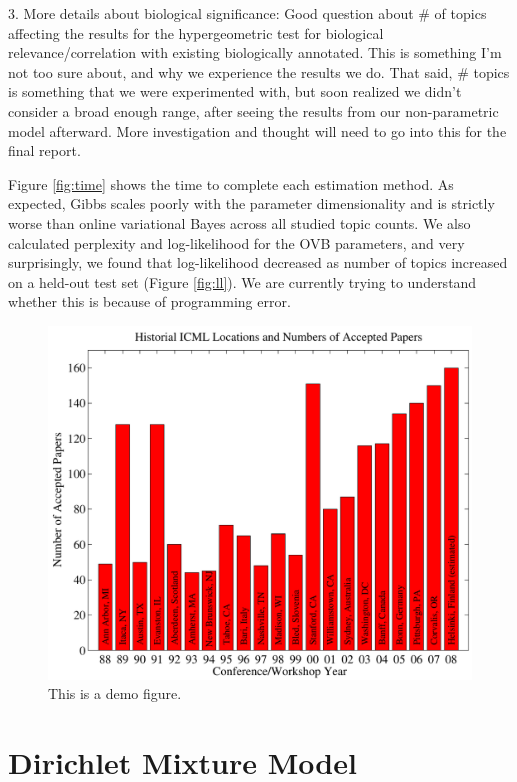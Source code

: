 \documentclass{article}
\begin{document}
3. More details about biological significance: Good question about \# of topics affecting the results for the hypergeometric test for biological relevance/correlation with existing biologically annotated. This is something I'm not too sure about, and why we experience the results we do. That said, \# topics is something that we were experimented with, but soon realized we didn't consider a broad enough range, after seeing the results from our non-parametric model afterward. More
investigation and thought will need to go into this for the final report.

Figure \ref{fig:time} shows the time to complete each estimation method. As expected, Gibbs scales poorly with the parameter dimensionality and is strictly worse than online variational Bayes across all studied topic counts. We also calculated perplexity and log-likelihood for the OVB parameters, and very surprisingly, we found that log-likelihood decreased as number of topics increased on a held-out test set (Figure \ref{fig:ll}). We are currently trying to understand whether this is because of programming error.


\begin{figure}[h]
\vskip 0.2in
\begin{center}
\centerline{\includegraphics[width=\columnwidth]{figs/examplegraph}}
\caption{This is a demo figure.}
\label{alabel}
\end{center}
\vskip -0.2in
\end{figure} 


\section{Dirichlet Mixture Model} 
\label{mmsec}
\end{document}
